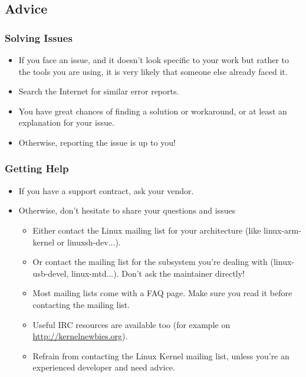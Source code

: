 \subsection{Advice}

\begin{frame}
  \frametitle{Solving Issues}
  \begin{itemize}
  \item If you face an issue, and it doesn't look specific to your
    work but rather to the tools you are using, it is very likely that
    someone else already faced it.
  \item Search the Internet for similar error reports.
  \item You have great chances of finding a solution or workaround, or
    at least an explanation for your issue.
  \item Otherwise, reporting the issue is up to you!
  \end{itemize}
\end{frame}

\begin{frame}
  \frametitle{Getting Help}
  \begin{itemize}
  \item If you have a support contract, ask your vendor.
  \item Otherwise, don't hesitate to share your questions and issues
    \begin{itemize}
    \item Either contact the Linux mailing list for your architecture
      (like linux-arm-kernel or linuxsh-dev...).
    \item Or contact the mailing list for the subsystem you're dealing
      with (linux-usb-devel, linux-mtd...). Don't ask the maintainer
      directly!
    \item Most mailing lists come with a FAQ page. Make sure you read
      it before contacting the mailing list.
    \item Useful IRC resources are available too
      (for example on \url{http://kernelnewbies.org}).
    \item Refrain from contacting the Linux Kernel mailing list,
      unless you're an experienced developer and need advice.
    \end{itemize}
  \end{itemize}
\end{frame}

